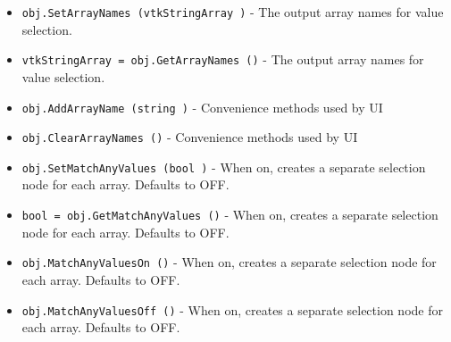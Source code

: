 \begin{itemize}
\item  \verb|obj.SetArrayNames (vtkStringArray )| -  The output array names for value selection.

\item  \verb|vtkStringArray = obj.GetArrayNames ()| -  The output array names for value selection.

\item  \verb|obj.AddArrayName (string )| -  Convenience methods used by UI

\item  \verb|obj.ClearArrayNames ()| -  Convenience methods used by UI

\item  \verb|obj.SetMatchAnyValues (bool )| -  When on, creates a separate selection node for each array.
 Defaults to OFF.

\item  \verb|bool = obj.GetMatchAnyValues ()| -  When on, creates a separate selection node for each array.
 Defaults to OFF.

\item  \verb|obj.MatchAnyValuesOn ()| -  When on, creates a separate selection node for each array.
 Defaults to OFF.

\item  \verb|obj.MatchAnyValuesOff ()| -  When on, creates a separate selection node for each array.
 Defaults to OFF.

\end{itemize}
